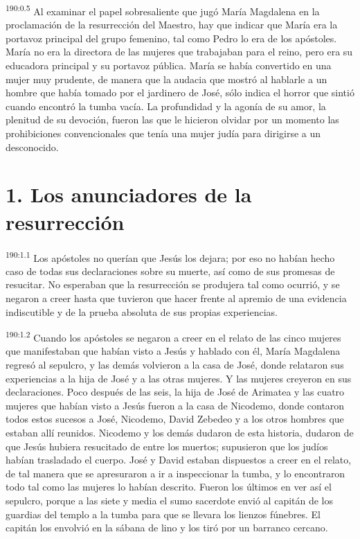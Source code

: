 \par 
\textsuperscript{190:0.5} Al examinar el papel sobresaliente que jugó María Magdalena en la proclamación de la resurrección del Maestro, hay que indicar que María era la portavoz principal del grupo femenino, tal como Pedro lo era de los apóstoles. María no era la directora de las mujeres que trabajaban para el reino, pero era su educadora principal y su portavoz pública. María se había convertido en una mujer muy prudente, de manera que la audacia que mostró al hablarle a un hombre que había tomado por el jardinero de José, sólo indica el horror que sintió cuando encontró la tumba vacía. La profundidad y la agonía de su amor, la plenitud de su devoción, fueron las que le hicieron olvidar por un momento las prohibiciones convencionales que tenía una mujer judía para dirigirse a un desconocido.

\section*{1. Los anunciadores de la resurrección}
\par 
\textsuperscript{190:1.1} Los apóstoles no querían que Jesús los dejara; por eso no habían hecho caso de todas sus declaraciones sobre su muerte, así como de sus promesas de resucitar. No esperaban que la resurrección se produjera tal como ocurrió, y se negaron a creer hasta que tuvieron que hacer frente al apremio de una evidencia indiscutible y de la prueba absoluta de sus propias experiencias.

\par 
\textsuperscript{190:1.2} Cuando los apóstoles se negaron a creer en el relato de las cinco mujeres que manifestaban que habían visto a Jesús y hablado con él, María Magdalena regresó al sepulcro, y las demás volvieron a la casa de José, donde relataron sus experiencias a la hija de José y a las otras mujeres. Y las mujeres creyeron en sus declaraciones. Poco después de las seis, la hija de José de Arimatea y las cuatro mujeres que habían visto a Jesús fueron a la casa de Nicodemo, donde contaron todos estos sucesos a José, Nicodemo, David Zebedeo y a los otros hombres que estaban allí reunidos. Nicodemo y los demás dudaron de esta historia, dudaron de que Jesús hubiera resucitado de entre los muertos; supusieron que los judíos habían trasladado el cuerpo. José y David estaban dispuestos a creer en el relato, de tal manera que se apresuraron a ir a inspeccionar la tumba, y lo encontraron todo tal como las mujeres lo habían descrito. Fueron los últimos en ver así el sepulcro, porque a las siete y media el sumo sacerdote envió al capitán de los guardias del templo a la tumba para que se llevara los lienzos fúnebres. El capitán los envolvió en la sábana de lino y los tiró por un barranco cercano.

